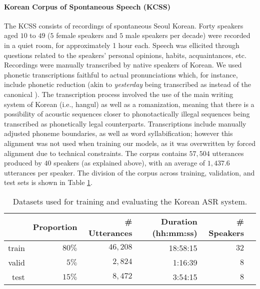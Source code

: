 \paragraph{Korean Corpus of Spontaneous Speech (KCSS)}

The KCSS \cite{yun2015} consists of recordings of spontaneous Seoul Korean. Forty speakers aged $10$ to $49$ ($5$ female speakers and $5$ male speakers per decade) were recorded in a quiet room, for approximately 1 hour each. Speech was ellicited through questions related to the speakers' personal opinions, habits, acquaintances, etc.      
Recordings were manually transcribed by native speakers of Korean. We used phonetic transcriptions faithful to actual pronunciations which, for instance, include phonetic reduction (akin to \textit{yesterday} being transcribed as  instead of the canonical ). The transcription process involved the use of the main writing system of Korean (i.e., hangul) as well as a romanization, meaning that there is a possibility of acoustic sequences closer to phonotactically illegal sequences being transcribed as phonetically legal counterparts.   
Transcriptions include manually adjusted phoneme boundaries, as well as word syllabification; however this alignment was not used when training our models, as it was overwritten by forced alignment due to technical constraints.
The corpus contains $57,504$ utterances produced by $40$ speakers (as explained above), with an average of $1,437.6$ utterances per speaker. The division of the corpus across training, validation, and test sets is shown in Table \ref{tab:hmm_kcss}.

\begin{table}[htb]
\centering
\caption{Datasets used for training and evaluating the Korean ASR system.}
\label{tab:hmm_kcss}
\vspace{0.25cm}
\begin{tabular}{rrrrrr}
  \toprule
      & Proportion & \# Utterances & Duration (hh:mm:ss) & \# Speakers &  \\ \midrule
  train & $80\%$ &  $46,208$ &   18:58:15   &   $32$    &  \\
  valid & $5\%$ &  $2,824$ &  1:16:39  &  $8$  &  \\
  test  & $15\%$ &  $8,472$ & 3:54:15   & $8$    & \\ \bottomrule
\end{tabular}
\end{table}

